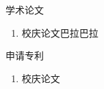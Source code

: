 



\begin{flushleft}
	{\large 学术论文}\\ 
	\begin{enumerate}
	\item 校庆论文巴拉巴拉
	\end{enumerate}
\end{flushleft}
	
\begin{flushleft}
	{\large 申请专利}\\ 
	\begin{enumerate}
		\item 校庆论文
		\end{enumerate}
\end{flushleft}


